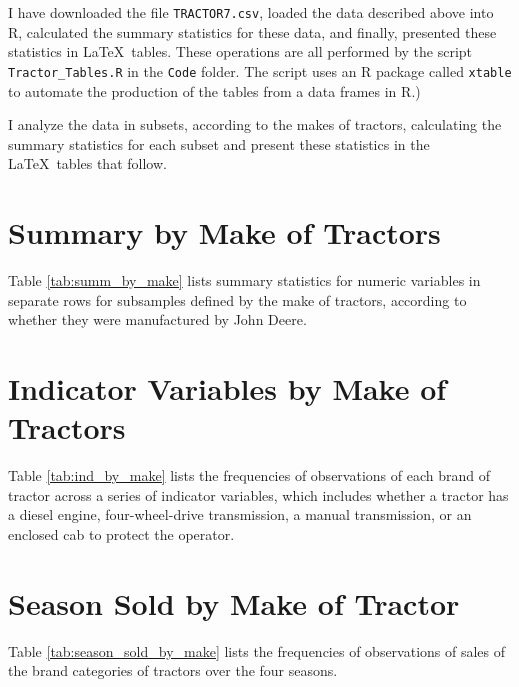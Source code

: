 \bigskip
\noindent
I have downloaded the file {\tt TRACTOR7.csv}, 
loaded the data described above into 
\textsf{R}, 
calculated the summary statistics for these data, 
and finally, presented 
these statistics in \LaTeX\ tables.
These operations are all performed by the script 
{\tt Tractor\_Tables.R} in the {\tt Code} folder. 
The script uses an \textsf{R} package called {\tt xtable} 
to automate the
production of the tables from a data frames in \textsf{R}.)

\medskip
\noindent
I analyze the data in subsets, according to the makes of tractors, 
calculating the summary statistics for each subset and present these 
statistics in the \LaTeX\ tables that follow.

\vfill


\pagebreak
\section{Summary by Make of Tractors}

Table \ref{tab:summ_by_make} 
lists summary statistics for numeric variables
in separate rows for subsamples defined by the make of tractors, 
according to whether they were manufactured by John Deere. 




\pagebreak
\section{Indicator Variables by Make of Tractors}

Table \ref{tab:ind_by_make} lists the frequencies of observations of 
each brand of tractor across a series of indicator variables, 
which includes whether a tractor
has a diesel engine, four-wheel-drive transmission, a manual transmission, 
or an enclosed cab to protect the operator.






\pagebreak
\section{Season Sold by Make of Tractor}

Table \ref{tab:season_sold_by_make} lists the frequencies of observations of 
sales of the brand categories of tractors 
over the four seasons. 


